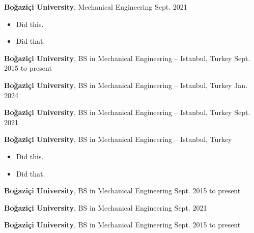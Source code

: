 \documentclass[10pt, letterpaper]{article}
\newenvironment{highlights}{
        \begin{itemize}[
                topsep=0pt,
                partopsep=0pt,
                itemsep=0pt,
                leftmargin=10pt
            ]
    }{
        \end{itemize}
    } %
\begin{document}
        \vspace{8pt}

        \textbf{Boğaziçi University}, Mechanical Engineering \hfill Sept. 2021

        \begin{highlights}
        \item Did this.
        \item Did that.
        \end{highlights}


        \vspace{8pt}

        \textbf{Boğaziçi University}, BS in Mechanical Engineering -- Istanbul, Turkey \hfill Sept. 2015 to present



        \vspace{8pt}

        \textbf{Boğaziçi University}, BS in Mechanical Engineering -- Istanbul, Turkey \hfill Jan. 2024



        \vspace{8pt}

        \textbf{Boğaziçi University}, BS in Mechanical Engineering -- Istanbul, Turkey \hfill Sept. 2021



        \vspace{8pt}

        \textbf{Boğaziçi University}, BS in Mechanical Engineering -- Istanbul, Turkey \hfill 

        \begin{highlights}
        \item Did this.
        \item Did that.
        \end{highlights}


        \vspace{8pt}

        \textbf{Boğaziçi University}, BS in Mechanical Engineering \hfill Sept. 2015 to present



        \vspace{8pt}

        \textbf{Boğaziçi University}, BS in Mechanical Engineering \hfill Sept. 2021



        \vspace{8pt}

        \textbf{Boğaziçi University}, BS in Mechanical Engineering \hfill Sept. 2015 to present
\end{document}
